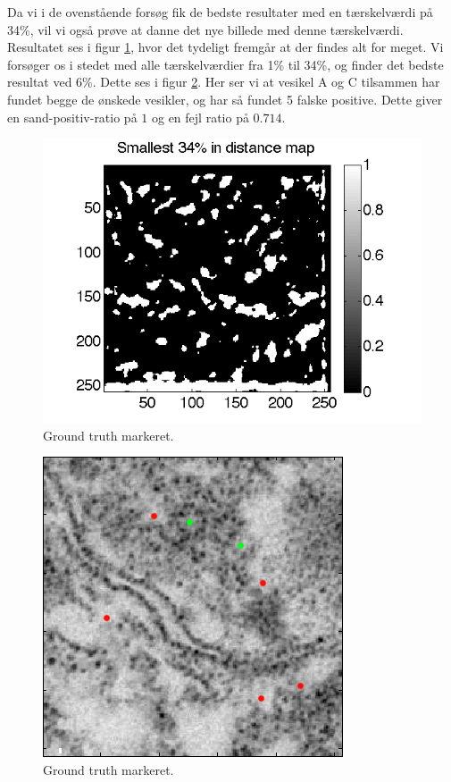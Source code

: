 Da vi i de ovenstående forsøg fik de bedste resultater med en tærskelværdi på 34\%, vil vi også prøve at danne det nye billede med denne tærskelværdi. Resultatet ses i figur \ref{fig:postmethod_conv_post_img3_th34}, hvor det tydeligt fremgår at der findes alt for meget. Vi forsøger os i stedet med alle tærskelværdier fra 1\% til 34\%, og finder det bedste resultat ved 6\%. Dette ses i figur \ref{fig:postmethod_conv_post_img3_th6}. Her ser vi at vesikel A og C tilsammen har fundet begge de ønskede vesikler, og har så fundet 5 falske positive. Dette giver en sand-positiv-ratio på $1$ og en fejl ratio på $0.714$.

\begin{figure}[H]
		\centering		\includegraphics[scale=0.65]{files/postmethod/img/ves1+2_img3_th-34.png}
	\caption{Ground truth markeret.\label{fig:postmethod_conv_post_img3_th34}}
\end{figure}

\begin{figure}[H]
		\centering
	\includegraphics[scale=0.65]{files/postmethod/img/ves1+2_img3_th-6.png}
	\caption{Ground truth markeret.\label{fig:postmethod_conv_post_img3_th6}}
\end{figure}

